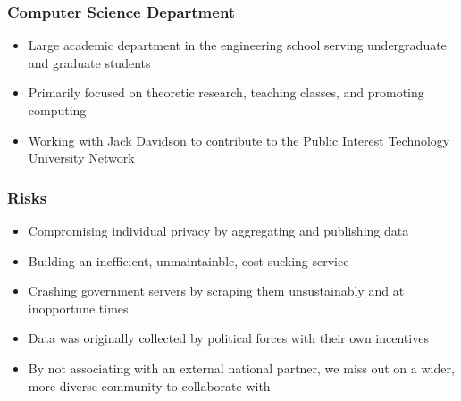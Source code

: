 \documentclass{beamer}
\begin{document}
\begin{frame}
\frametitle{Computer Science Department}
\begin{itemize}
    \item Large academic department in the engineering school serving undergraduate and graduate students
    \item Primarily focused on theoretic research, teaching classes, and promoting computing
    \item Working with Jack Davidson to contribute to the Public Interest Technology University Network
\end{itemize}
\end{frame}

\begin{frame}
\frametitle{Risks}
\begin{itemize}
    \item Compromising individual privacy by aggregating and publishing data 
    \item Building an inefficient, unmaintainble, cost-sucking service
    \item Crashing government servers by scraping them unsustainably and at inopportune times
    \item Data was originally collected by political forces with their own incentives
    \item By not associating with an external national partner, we miss out on a wider, more diverse community to collaborate with
\end{itemize}
\end{frame}
 
\end{document}
